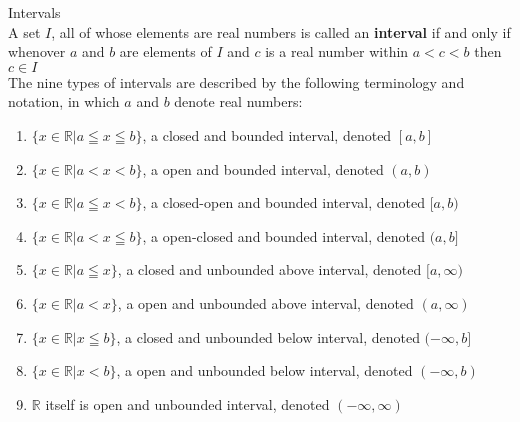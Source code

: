 \begin{definition}
Intervals \\

A set $I$, all of whose elements are real numbers is called an {\bf interval} if and only if whenover $a$ and $b$ are elements of $I$ and $c$ is a real number within $a<c<b$ then $c \in I$ \\

The nine types of intervals are described by the following terminology and notation, in which $a$ and $b$ denote real numbers: \\
\begin{tcolorbox}
    \begin{enumerate}
        \item $\{x \in \mathbb{R} | a \leqq x \leqq b \}$, a closed and bounded interval, denoted $[a,b]$ 
        
        \item $\{x \in \mathbb{R} | a < x < b \}$, a open and bounded interval, denoted $(a,b)$ 
        
        \item $\{x \in \mathbb{R} | a \leqq x < b \}$, a closed-open and bounded interval, denoted $[a,b)$ 
        
        \item $\{x \in \mathbb{R} | a < x \leqq b \}$, a open-closed and bounded interval, denoted $(a,b]$ 
        
        \item $\{x \in \mathbb{R} | a \leqq x \}$, a closed and unbounded above interval, denoted $[a, \infty)$ 
        
        \item $\{x \in \mathbb{R} | a < x \}$, a open and unbounded above interval, denoted $(a, \infty)$ 
        
        \item $\{x \in \mathbb{R} | x \leqq b \}$, a closed and unbounded below interval, denoted $(- \infty ,b]$ 
        
        \item $\{x \in \mathbb{R} | x < b \}$, a open and unbounded below interval, denoted $(- \infty ,b)$
        
        \item $\mathbb{R}$ itself is open and unbounded interval, denoted $(- \infty, \infty)$ \\
    \end{enumerate}
\end{tcolorbox}

\end{definition}



